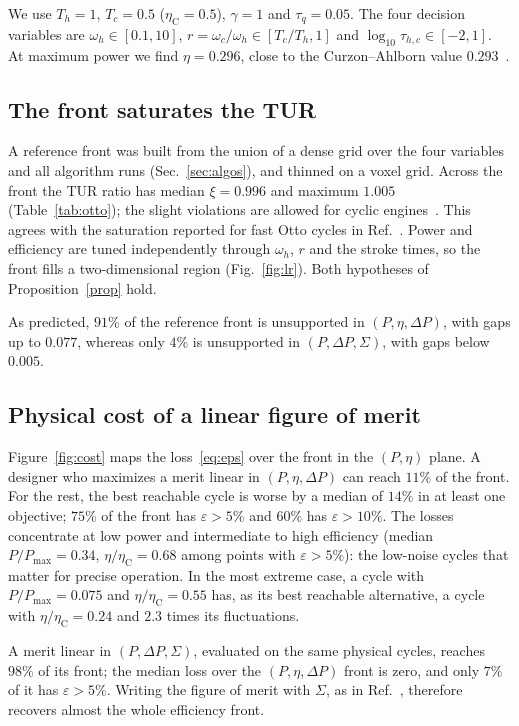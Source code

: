 \documentclass[pre,twocolumn,superscriptaddress,nofootinbib,longbibliography]{revtex4-2}
\newcommand{\etaC}{\eta_{\mathrm{C}}}
\newcommand{\Pmax}{P_{\max}}
\begin{document}
We use $T_h = 1$, $T_c = 0.5$ ($\etaC = 0.5$), $\gamma = 1$ and $\tau_q = 0.05$. The four decision
variables are $\omega_h \in [0.1, 10]$, $r = \omega_c/\omega_h \in [T_c/T_h, 1]$ and
$\log_{10}\tau_{h,c} \in [-2, 1]$. At maximum power we find $\eta = 0.296$, close to the
Curzon--Ahlborn value $0.293$~\cite{CurzonAhlborn1975}.

\subsection{The front saturates the TUR}

A reference front was built from the union of a dense grid over the four variables and all
algorithm runs (Sec.~\ref{sec:algos}), and thinned on a voxel grid. Across the front the TUR ratio
has median $\xi = 0.996$ and maximum $1.005$ (Table~\ref{tab:otto}); the slight violations are
allowed for cyclic engines~\cite{Holubec2018}. This agrees with the saturation reported for fast
Otto cycles in Ref.~\cite{Erdman2023}. Power and efficiency are tuned independently through
$\omega_h$, $r$ and the stroke times, so the front fills a two-dimensional region
(Fig.~\ref{fig:lr}). Both hypotheses of Proposition~\ref{prop} hold.

As predicted, $91\%$ of the reference front is unsupported in $(P,\eta,\Delta P)$, with gaps up to
$0.077$, whereas only $4\%$ is unsupported in $(P,\Delta P,\Sigma)$, with gaps below $0.005$.

\subsection{Physical cost of a linear figure of merit}

Figure~\ref{fig:cost} maps the loss~\eqref{eq:eps} over the front in the $(P,\eta)$ plane. A
designer who maximizes a merit linear in $(P,\eta,\Delta P)$ can reach $11\%$ of the front. For
the rest, the best reachable cycle is worse by a median of $14\%$ in at least one objective;
$75\%$ of the front has $\varepsilon > 5\%$ and $60\%$ has $\varepsilon > 10\%$. The losses
concentrate at low power and intermediate to high efficiency (median $P/\Pmax = 0.34$,
$\eta/\etaC = 0.68$ among points with $\varepsilon > 5\%$): the low-noise cycles that matter for
precise operation. In the most extreme case, a cycle with $P/\Pmax = 0.075$ and
$\eta/\etaC = 0.55$ has, as its best reachable alternative, a cycle with $\eta/\etaC = 0.24$ and
$2.3$ times its fluctuations.

A merit linear in $(P,\Delta P,\Sigma)$, evaluated on the same physical cycles, reaches $98\%$ of
its front; the median loss over the $(P,\eta,\Delta P)$ front is zero, and only $7\%$ of it has
$\varepsilon > 5\%$. Writing the figure of merit with $\Sigma$, as in Ref.~\cite{Erdman2023},
therefore recovers almost the whole efficiency front.
\end{document}
